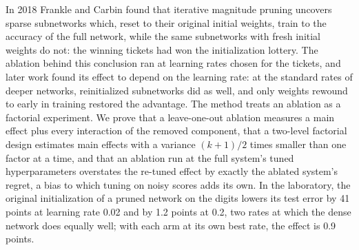 \begin{refsection}


\begin{chaptersummary}
In 2018 Frankle and Carbin found that iterative magnitude pruning uncovers sparse subnetworks which, reset to their original initial weights, train to the accuracy of the full network, while the same subnetworks with fresh initial weights do not: the winning tickets had won the initialization lottery. The ablation behind this conclusion ran at learning rates chosen for the tickets, and later work found its effect to depend on the learning rate: at the standard rates of deeper networks, reinitialized subnetworks did as well, and only weights rewound to early in training restored the advantage. The method treats an ablation as a factorial experiment. We prove that a leave-one-out ablation measures a main effect plus every interaction of the removed component, that a two-level factorial design estimates main effects with a variance $(k+1)/2$ times smaller than one factor at a time, and that an ablation run at the full system's tuned hyperparameters overstates the re-tuned effect by exactly the ablated system's regret, a bias to which tuning on noisy scores adds its own. In the laboratory, the original initialization of a pruned network on the digits lowers its test error by 41 points at learning rate 0.02 and by 1.2 points at 0.2, two rates at which the dense network does equally well; with each arm at its own best rate, the effect is 0.9 points.
\end{chaptersummary}


\end{refsection}
